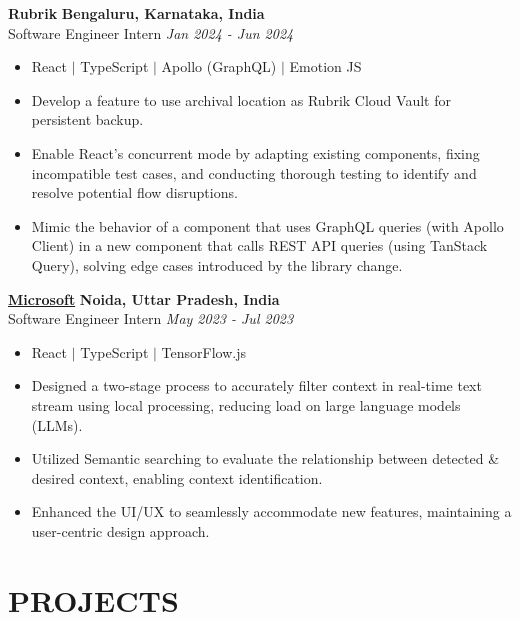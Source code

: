 \documentclass[12pt]{article}
\begin{document}
\textbf{Rubrik} \hfill \textbf{Bengaluru, Karnataka, India} \\
Software Engineer Intern  \hfill \textit{Jan 2024 - Jun 2024} \\
\begin{itemize}[topsep=1pt, itemsep=1.5pt, partopsep=1pt, parsep=1pt]
	\item React $|$ TypeScript $|$ Apollo (GraphQL) $|$ Emotion JS
	\item Develop a feature to use archival location as Rubrik Cloud Vault for persistent backup.
	\item Enable React's concurrent mode by adapting existing components, fixing incompatible test cases, and conducting thorough testing to identify and resolve potential flow disruptions.
	\item Mimic the behavior of a component that uses GraphQL queries (with Apollo Client) in a new component that calls REST API queries (using TanStack Query), solving edge cases introduced by the library change.
\end{itemize}



\textbf{\href{https://drive.google.com/file/d/1AmHyhbctI577QKw8zxRCBjzVVyGyQHvb/view}{Microsoft}} \hfill \textbf{Noida, Uttar Pradesh, India} \\
Software Engineer Intern  \hfill \textit{May 2023 - Jul 2023} \\
\begin{itemize}[topsep=1pt, itemsep=1.5pt, partopsep=1pt, parsep=1pt]
	\item React $|$ TypeScript $|$ TensorFlow.js
	\item Designed a two-stage process to accurately filter context in real-time text stream using local processing, reducing load on large language models (LLMs).
	\item Utilized Semantic searching to evaluate the relationship between detected \& desired context, enabling context identification.
	\item Enhanced the UI/UX to seamlessly accommodate new features, maintaining a user-centric design approach.
\end{itemize}

\section*{PROJECTS}
\end{document}
